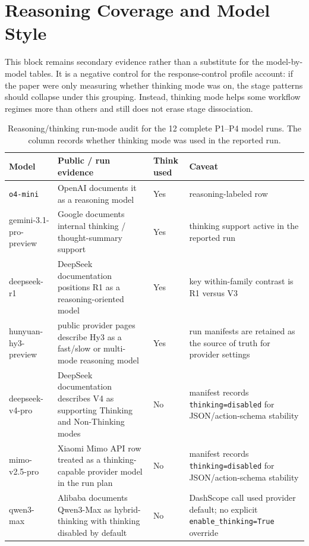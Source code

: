 \section{Reasoning Coverage and Model Style}

This block remains secondary evidence rather than a substitute for the model-by-model tables. It is a negative control for the response-control profile account: if the paper were only measuring whether thinking mode was on, the stage patterns should collapse under this grouping. Instead, thinking mode helps some workflow regimes more than others and still does not erase stage dissociation.

\begin{table}[t]
\caption{Reasoning/thinking run-mode audit for the 12 complete P1--P4 model runs. The column records whether thinking mode was used in the reported run.}
\label{tab:appendix_reasoning_grouping}
\centering
\scriptsize
\setlength{\tabcolsep}{3.5pt}
\renewcommand{\arraystretch}{1.08}
\begin{tabular}{lp{33mm}p{17mm}p{54mm}}
\toprule
Model & Public / run evidence & Think used & Caveat \\
\midrule
\texttt{o4-mini} & OpenAI documents it as a reasoning model~\citep{openai2026o4mini} & Yes & reasoning-labeled row \\
gemini-3.1-pro-preview & Google documents internal thinking / thought-summary support~\citep{google2026geminithinking} & Yes & thinking support active in the reported run \\
deepseek-r1 & DeepSeek documentation positions R1 as a reasoning-oriented model~\citep{deepseek2025r1} & Yes & key within-family contrast is R1 versus V3 \\
hunyuan-hy3-preview & public provider pages describe Hy3 as a fast/slow or multi-mode reasoning model~\citep{siliconflow2026hy3preview} & Yes & run manifests are retained as the source of truth for provider settings \\
deepseek-v4-pro & DeepSeek documentation describes V4 as supporting Thinking and Non-Thinking modes~\citep{deepseek2026v4preview} & No & manifest records \texttt{thinking=disabled} for JSON/action-schema stability \\
mimo-v2.5-pro & Xiaomi Mimo API row treated as a thinking-capable provider model in the run plan & No & manifest records \texttt{thinking=disabled} for JSON/action-schema stability \\
qwen3-max & Alibaba documents Qwen3-Max as hybrid-thinking with thinking disabled by default~\citep{alibaba2026qwenDeepThinking} & No & DashScope call used provider default; no explicit \texttt{enable\_thinking=True} override \\

\end{tabular}
\end{table}
